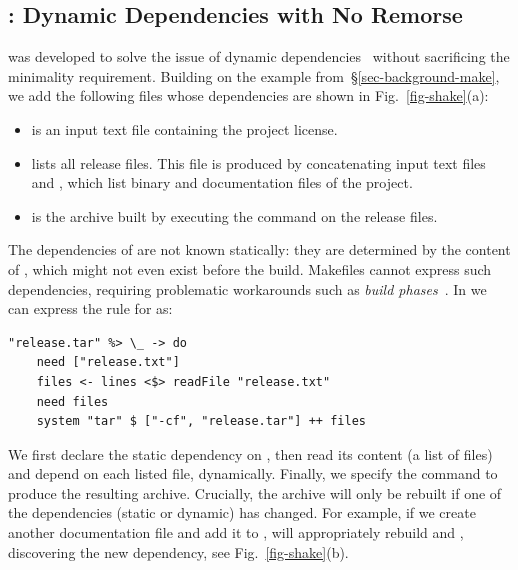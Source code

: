 \vspace{-1mm}
\subsection{\Shake: Dynamic Dependencies with No Remorse}
\label{sec-background-shake}

\Shake was developed to solve the issue of dynamic
dependencies~\cite{mitchell2012shake} without sacrificing
the minimality requirement. Building on the \Make example
from~\S\ref{sec-background-make}, we add the following files whose
dependencies are shown in Fig.~\ref{fig-shake}(a):

\begin{itemize}
    \item {} is an input text file containing the project license.
    \item {} lists all release files. This file is produced by
    concatenating input text files  and , which list
    binary and documentation files of the project.
    \item {} is the archive built by executing the command
     on the release files.
\end{itemize}

The dependencies of  are not known statically: they are
determined by the content of , which might not even exist
before the build. Makefiles cannot express such dependencies, requiring problematic
workarounds such as \emph{build phases}~\cite{hadrian}.
In \Shake we can express the rule for  as:

\begin{verbatim}
"release.tar" %> \_ -> do
    need ["release.txt"]
    files <- lines <$> readFile "release.txt"
    need files
    system "tar" $ ["-cf", "release.tar"] ++ files
\end{verbatim}

\noindent
We first declare the static dependency on , then read its
content (a list of files) and depend on each listed file, dynamically. Finally, we specify the
command to produce the resulting archive. Crucially, the archive will only be
rebuilt if one of the dependencies (static or dynamic) has changed. For example,
if we create another documentation file  and add it to
, \Shake will appropriately rebuild  and
, discovering the new dependency, see Fig.~\ref{fig-shake}(b).

